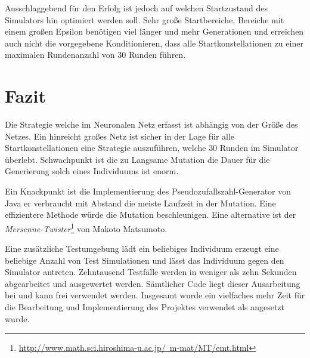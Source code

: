 Ausschlaggebend für den Erfolg ist jedoch auf welchen Startzustand des Simulators hin optimiert werden soll. Sehr große Startbereiche, Bereiche mit einem großen Epsilon benötigen viel länger und mehr Generationen und erreichen auch nicht die vorgegebene Konditionieren, dass alle Startkonstellationen zu einer maximalen Rundenanzahl von $30$ Runden führen.

\section{Fazit}
Die Strategie welche im Neuronalen Netz erfasst ist abhängig von der Größe des Netzes. Ein hinreicht großes Netz ist sicher in der Lage für alle Startkonstellationen eine Strategie auszuführen, welche $30$ Runden im Simulator überlebt. Schwachpunkt ist die zu Langsame Mutation die Dauer für die Generierung solch eines Individuums ist enorm.

Ein Knackpunkt ist die Implementierung des Pseudozufallszahl-Generator von Java er verbraucht mit Abstand die meiste Laufzeit in der Mutation. Eine effizientere Methode würde die Mutation beschleunigen. Eine alternative ist der \textit{Mersenne-Twister}\footnote{\hyperref[Mersenne-Twister]{http://www.math.sci.hiroshima-u.ac.jp/~m-mat/MT/emt.html}
} von Makoto Matsumoto.

Eine zusätzliche Testumgebung lädt ein beliebiges Individuum erzeugt eine beliebige Anzahl von Test Simulationen und lässt das Individuum gegen den Simulator antreten. Zehntausend Testfälle werden in weniger als zehn Sekunden abgearbeitet und ausgewertet werden. Sämtlicher Code liegt dieser Ausarbeitung bei und kann frei verwendet werden. Insgesamt wurde ein vielfaches mehr Zeit für die Bearbeitung und Implementierung des Projektes verwendet als angesetzt wurde.